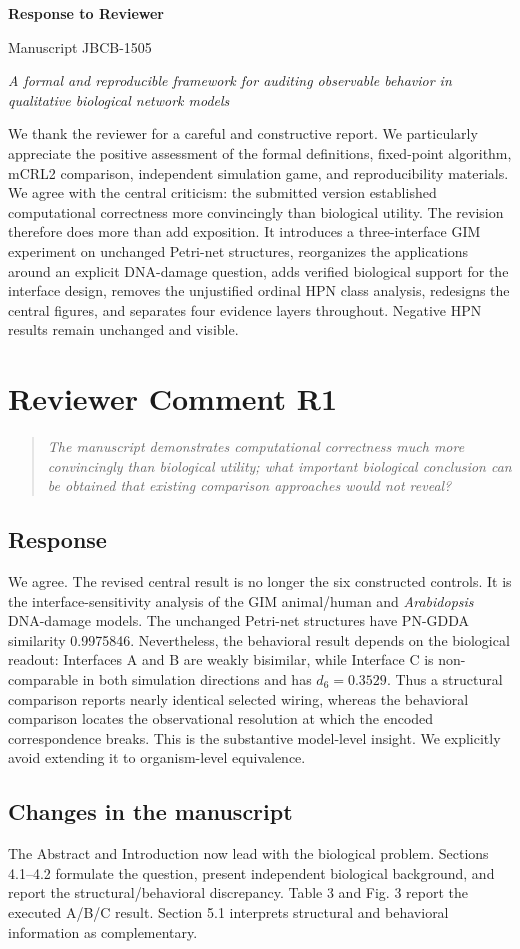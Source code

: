 \documentclass[11pt]{article}
\newcommand{\reviewcomment}[2]{%
  \section*{Reviewer Comment #1}
  \begin{quote}\itshape #2\end{quote}}
\newcommand{\response}{\subsection*{Response}}
\newcommand{\manuscriptchanges}{\subsection*{Changes in the manuscript}}
\begin{document}
\begin{center}
{\Large\bfseries Response to Reviewer}\par
\vspace{4pt}
{\large Manuscript JBCB-1505}\par
\vspace{2pt}
\textit{A formal and reproducible framework for auditing observable behavior in
qualitative biological network models}
\end{center}

We thank the reviewer for a careful and constructive report. We particularly
appreciate the positive assessment of the formal definitions, fixed-point
algorithm, mCRL2 comparison, independent simulation game, and reproducibility
materials. We agree with the central criticism: the submitted version
established computational correctness more convincingly than biological
utility. The revision therefore does more than add exposition. It introduces a
three-interface GIM experiment on unchanged Petri-net structures, reorganizes
the applications around an explicit DNA-damage question, adds verified
biological support for the interface design, removes the unjustified ordinal
HPN class analysis, redesigns the central figures, and separates four evidence
layers throughout. Negative HPN results remain unchanged and visible.

\reviewcomment{R1}{The manuscript demonstrates computational correctness much
more convincingly than biological utility; what important biological conclusion
can be obtained that existing comparison approaches would not reveal?}

\response
We agree. The revised central result is no longer the six constructed controls.
It is the interface-sensitivity analysis of the GIM animal/human and
\textit{Arabidopsis} DNA-damage models. The unchanged Petri-net structures have
PN-GDDA similarity 0.9975846. Nevertheless, the behavioral result depends on
the biological readout: Interfaces A and B are weakly bisimilar, while Interface
C is non-comparable in both simulation directions and has $d_6=0.3529$. Thus a
structural comparison reports nearly identical selected wiring, whereas the
behavioral comparison locates the observational resolution at which the encoded
correspondence breaks. This is the substantive model-level insight. We explicitly
avoid extending it to organism-level equivalence.

\manuscriptchanges
The Abstract and Introduction now lead with the biological problem. Sections
4.1--4.2 formulate the question, present independent biological background, and
report the structural/behavioral discrepancy. Table 3 and Fig. 3 report the
executed A/B/C result. Section 5.1 interprets structural and behavioral
information as complementary.
\end{document}
